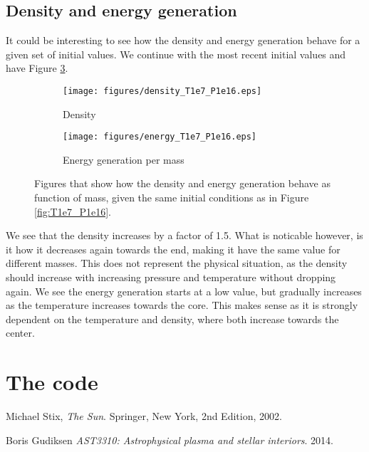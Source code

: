 \documentclass[a4paper, 11pt, english]{article}
\newcommand{\refig}[1]{\textcolor{blue}{\ref{fig:#1}}} %
\begin{document}
\subsection{Density and energy generation}
It could be interesting to see how the density and energy generation behave for a given
set of initial values. We continue with the most recent initial values and have Figure
\refig{density_epsilon}.
%
\begin{figure}[htpb]
	\centering
	\begin{subfigure}{0.49\textwidth}
		\texttt{[image: figures/density\_T1e7\_P1e16.eps]}
		\caption{Density}
		\label{fig:density_T1e7_P1e16}
	\end{subfigure}\hfill
	\begin{subfigure}{0.49\textwidth}
		\texttt{[image: figures/energy\_T1e7\_P1e16.eps]}
		\caption{Energy generation per mass}
		\label{fig:epsilon_T1e7_P1e16}
	\end{subfigure}
	\vspace{0.2cm}
	\caption{Figures that show how the density and energy generation behave as function of
		mass, given the same initial conditions as in Figure \refig{T1e7_P1e16}.}
	\label{fig:density_epsilon}
\end{figure}
%
We see that the density increases by a factor of 1.5. What is noticable however, is it how
it decreases again towards the end, making it have the same value for different masses.
This does not represent the physical situation, as the density should increase with
increasing pressure and temperature without dropping again. We see the energy generation
starts at a low value, but gradually increases as the temperature increases towards the core.
This makes sense as it is strongly dependent on the temperature and density, where both
increase towards the center.

\newpage
\section{The code}


\begin{thebibliography}{9}
		Michael Stix,
		\emph{The Sun}.
		Springer, New York,
		2nd Edition,
		2002.

		Boris Gudiksen
		\emph{AST3310: Astrophysical plasma and stellar interiors}.
		2014.

\end{thebibliography}
\end{document}
